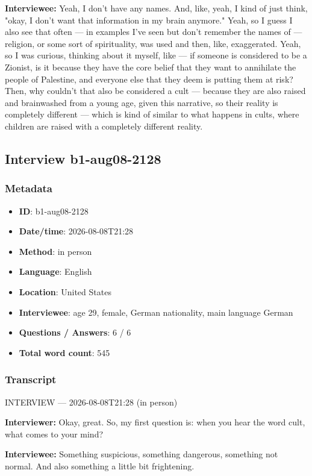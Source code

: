 \textbf{Interviewee:} Yeah, I don't have any names. And, like, yeah, I kind of just think, "okay, I don't want that information in my brain anymore."  Yeah, so I guess I also see that often — in examples I've seen but don't remember the names of — religion, or some sort of spirituality, was used and then, like, exaggerated. Yeah, so I was curious, thinking about it myself, like — if someone is considered to be a Zionist, is it because they have the core belief that they want to annihilate the people of Palestine, and everyone else that they deem is putting them at risk? Then, why couldn't that also be considered a cult — because they are also raised and brainwashed from a young age, given this narrative, so their reality is completely different — which is kind of similar to what happens in cults, where children are raised with a completely different reality.

\subsection{Interview b1-aug08-2128}\label{int:b1-aug08-2128}
\subsubsection*{Metadata}
\begin{itemize}
  \item \textbf{ID}: b1-aug08-2128
  \item \textbf{Date/time}: 2026-08-08T21:28
  \item \textbf{Method}: in person
  \item \textbf{Language}: English
  \item \textbf{Location}: United States
  \item \textbf{Interviewee}: age 29, female, German nationality, main language German
  \item \textbf{Questions / Answers}: 6 / 6
  \item \textbf{Total word count}: 545
\end{itemize}
\subsubsection*{Transcript}
INTERVIEW — 2026-08-08T21:28 (in person)

\textbf{Interviewer:} Okay, great. So, my first question is: when you hear the word cult, what comes to your mind?

\textbf{Interviewee:} Something suspicious, something dangerous, something not normal. And also something a little bit frightening.

